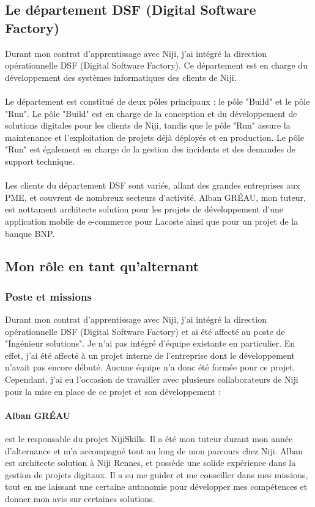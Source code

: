 \documentclass[12pt]{article}
\begin{document}
\subsection{Le département DSF (Digital Software Factory)}
Durant mon contrat d'apprentissage avec Niji, j'ai intégré la direction opérationnelle DSF (Digital Software Factory). Ce département est en charge du développement des systèmes informatiques des clients de Niji.
\\\\
Le département est constitué de deux pôles principaux : le pôle "Build" et le pôle "Run". Le pôle "Build" est en charge de la conception et du développement de solutions digitales pour les clients de Niji, tandis que le pôle "Run" assure la maintenance et l'exploitation de projets déjà déployés et en production. Le pôle "Run" est également en charge de la gestion des incidents et des demandes de support technique.
\\\\
Les clients du département DSF sont variés, allant des grandes entreprises aux PME, et couvrent de nombreux secteurs d'activité. 
Alban GRÉAU, mon tuteur, est nottament architecte solution pour les projets de développement d'une application mobile de e-commerce pour Lacoste ainsi que pour un projet de la banque BNP.
\subsection{Mon rôle en tant qu’alternant}
\subsubsection{Poste et missions}
Durant mon contrat d'apprentissage avec Niji, j'ai intégré la direction opérationnelle DSF (Digital Software Factory) et ai été affecté au poste de "Ingénieur solutions".
Je n'ai pas intégré d'équipe existante en particulier. En effet, j'ai été affecté à un projet interne de l'entreprise dont le développement n'avait pas encore débuté. Aucune équipe n'a donc été formée pour ce projet. Cependant, j'ai eu l'occasion de travailler avec plusieurs collaborateurs de Niji pour la mise en place de ce projet et son développement :
\paragraph{Alban GRÉAU} est le responsable du projet NijiSkills. Il a été mon tuteur durant mon année d'alternance et m'a accompagné tout au long de mon parcours chez Niji. Alban est architecte solution à Niji Rennes, et possède une solide expérience dans la gestion de projets digitaux. Il a su me guider et me conseiller dans mes missions, tout en me laissant une certaine autonomie pour développer mes compétences et donner mon avis sur certaines solutions.
\end{document}
